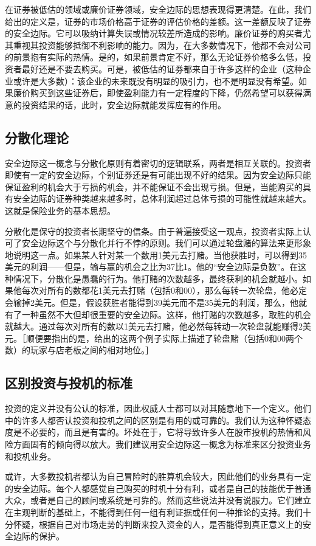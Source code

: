 \documentclass[12pt,oneside]{book}
\begin{document}
在证券被低估的领域或廉价证券领域，安全边际的思想表现得更清楚。在此，我们给出的定义是，证券的市场价格高于证券的评估价格的差额。这一差额反映了证券的安全边际。它可以吸纳计算失误或情况较差所造成的影响。廉价证券的购买者尤其重视其投资能够抵御不利影响的能力。因为，在大多数情况下，他都不会对公司的前景抱有实际的热情。是的，如果前景肯定不好，那么无论证券价格多么低，投资者最好还是不要去购买。可是，被低估的证券都来自于许多这样的企业（这种企业或许是大多数）：该企业的未来既没有明显的吸引力，也不是明显没有希望。如果廉价购买到这些证券后，即使盈利能力有一定程度的下降，仍然希望可以获得满意的投资结果的话，此时，安全边际就能发挥应有的作用。

\subsection{分散化理论}
安全边际这一概念与分散化原则有着密切的逻辑联系，两者是相互关联的。投资者即使有一定的安全边际，个别证券还是有可能出现不好的结果。因为安全边际只能保证盈利的机会大于亏损的机会，并不能保证不会出现亏损。但是，当能购买的具有安全边际的证券种类越来越多时，总体利润超过总体亏损的可能性就越来越大。这就是保险业务的基本思想。

分散化是保守的投资者长期坚守的信条。由于普遍接受这一观点，投资者实际上认可了安全边际这个与分散化并行不悖的原则。我们可以通过轮盘赌的算法来更形象地说明这一点。如果某人针对某一个数用1美元去打赌。当他获胜时，可以得到35美元的利润——但是，输与赢的机会之比为37比1。他的“安全边际是负数”。在这种情况下，分散化是愚蠢的行为。他打赌的次数越多，最终获利的机会就越小。如果他每次对所有的数都花1美元去打赌（包括0和00），那么每转一次轮盘，他必定会输掉2美元。但是，假设获胜者能得到39美元而不是35美元的利润，那么，他就有了一种虽然不大但却很重要的安全边际。这样，他打赌的次数越多，取胜的机会就越大。通过每次对所有的数以1美元去打赌，他必然每转动一次轮盘就能赚得2美元。［顺便要指出的是，给出的这两个例子实际上描述了轮盘赌（包括0和00两个数）的玩家与店老板之间的相对地位。］

\subsection{区别投资与投机的标准}
投资的定义并没有公认的标准，因此权威人士都可以对其随意地下一个定义。他们中的许多人都否认投资和投机之间的区别是有用的或可靠的。我们认为这种怀疑态度是不必要的，而且是有害的。坏处在于，它将导致许多人在股市投机的热情和风险方面固有的倾向得以放大。我们建议用安全边际这一概念为标准来区分投资业务和投机业务。

或许，大多数投机者都认为自己冒险时的胜算机会较大，因此他们的业务具有一定的安全边际。每个人都感觉自己购买的时机十分有利，或者是自己的技能优于普通大众，或者是自己的顾问或系统是可靠的。然而这些说法并没有说服力。它们建立在主观判断的基础上，不能得到任何一组有利证据或任何一种推论的支持。我们十分怀疑，根据自己对市场走势的判断来投入资金的人，是否能得到真正意义上的安全边际的保护。
\end{document}
